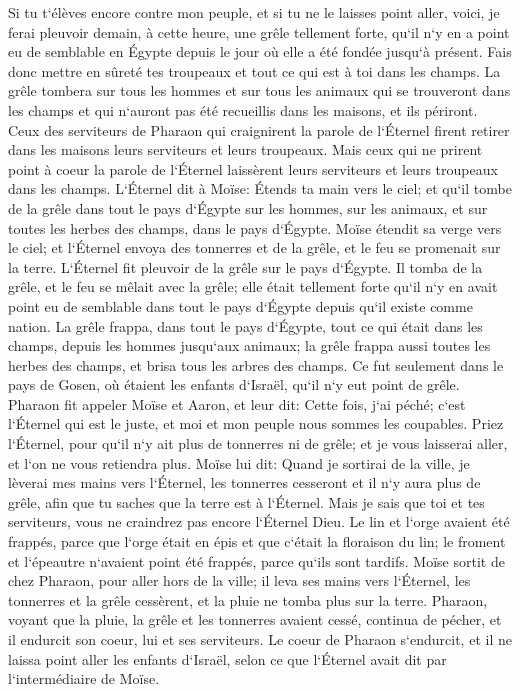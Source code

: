 \verse Si tu t`élèves encore contre mon peuple, et si tu ne le laisses point aller, 
\verse voici, je ferai pleuvoir demain, à cette heure, une grêle tellement forte, qu`il n`y en a point eu de semblable en Égypte depuis le jour où elle a été fondée jusqu`à présent. 
\verse Fais donc mettre en sûreté tes troupeaux et tout ce qui est à toi dans les champs. La grêle tombera sur tous les hommes et sur tous les animaux qui se trouveront dans les champs et qui n`auront pas été recueillis dans les maisons, et ils périront. 
\verse Ceux des serviteurs de Pharaon qui craignirent la parole de l`Éternel firent retirer dans les maisons leurs serviteurs et leurs troupeaux. 
\verse Mais ceux qui ne prirent point à coeur la parole de l`Éternel laissèrent leurs serviteurs et leurs troupeaux dans les champs. 
\verse L`Éternel dit à Moïse: Étends ta main vers le ciel; et qu`il tombe de la grêle dans tout le pays d`Égypte sur les hommes, sur les animaux, et sur toutes les herbes des champs, dans le pays d`Égypte. 
\verse Moïse étendit sa verge vers le ciel; et l`Éternel envoya des tonnerres et de la grêle, et le feu se promenait sur la terre. L`Éternel fit pleuvoir de la grêle sur le pays d`Égypte. 
\verse Il tomba de la grêle, et le feu se mêlait avec la grêle; elle était tellement forte qu`il n`y en avait point eu de semblable dans tout le pays d`Égypte depuis qu`il existe comme nation. 
\verse La grêle frappa, dans tout le pays d`Égypte, tout ce qui était dans les champs, depuis les hommes jusqu`aux animaux; la grêle frappa aussi toutes les herbes des champs, et brisa tous les arbres des champs. 
\verse Ce fut seulement dans le pays de Gosen, où étaient les enfants d`Israël, qu`il n`y eut point de grêle. 
\verse Pharaon fit appeler Moïse et Aaron, et leur dit: Cette fois, j`ai péché; c`est l`Éternel qui est le juste, et moi et mon peuple nous sommes les coupables. 
\verse Priez l`Éternel, pour qu`il n`y ait plus de tonnerres ni de grêle; et je vous laisserai aller, et l`on ne vous retiendra plus. 
\verse Moïse lui dit: Quand je sortirai de la ville, je lèverai mes mains vers l`Éternel, les tonnerres cesseront et il n`y aura plus de grêle, afin que tu saches que la terre est à l`Éternel. 
\verse Mais je sais que toi et tes serviteurs, vous ne craindrez pas encore l`Éternel Dieu. 
\verse Le lin et l`orge avaient été frappés, parce que l`orge était en épis et que c`était la floraison du lin; 
\verse le froment et l`épeautre n`avaient point été frappés, parce qu`ils sont tardifs. 
\verse Moïse sortit de chez Pharaon, pour aller hors de la ville; il leva ses mains vers l`Éternel, les tonnerres et la grêle cessèrent, et la pluie ne tomba plus sur la terre. 
\verse Pharaon, voyant que la pluie, la grêle et les tonnerres avaient cessé, continua de pécher, et il endurcit son coeur, lui et ses serviteurs. 
\verse Le coeur de Pharaon s`endurcit, et il ne laissa point aller les enfants d`Israël, selon ce que l`Éternel avait dit par l`intermédiaire de Moïse. 

